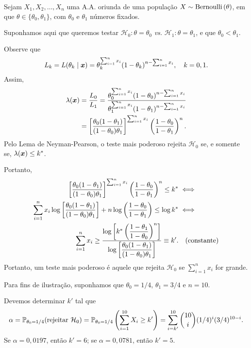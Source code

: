 \begin{example}
Sejam $X_1,X_2,\ldots,X_n$ uma A.A. oriunda de uma população $X\sim\berndist{\theta}$, em que $\theta\in\{\theta_0,\theta_1\}$, com $\theta_0$ e $\theta_1$ números fixados.

Suponhamos aqui que queremos testar $\mathcal{H}_0:\theta=\theta_0$ \emph{vs.} $\mathcal{H}_1:\theta=\theta_1$, e que $\theta_0<\theta_1$.

Observe que
\begin{equation}
L_k=L(\theta_k\mid\v{x})=\theta_k^{\sum_{i=1}^n x_i}(1-\theta_k)^{n-\sum_{i=1}^n x_i}, \quad k=0,1.
\end{equation}
Assim,
\begin{align}
\lambda(\v{x}) &= \frac{L_0}{L_1}=\frac{\theta_0^{\sum_{i=1}^n x_i}(1-\theta_0)^{n-\sum_{i=1}^n x_i}}{\theta_1^{\sum_{i=1}^n x_i}(1-\theta_1)^{n-\sum_{i=1}^n x_i}}\notag\\
&= \left[\frac{\theta_0(1-\theta_1)}{(1-\theta_0)\theta_1}\right]^{\sum_{i=1}^n x_i}\left(\frac{1-\theta_0}{1-\theta_1}\right)^n.
\end{align}
Pelo Lema de Neyman-Pearson, o teste mais poderoso rejeita $\mathcal{H}_0$ se, e somente se, $\lambda(\v{x})\leq k^*$.

Portanto,
\begin{align}
\left[\frac{\theta_0(1-\theta_1)}{(1-\theta_0)\theta_1}\right]^{\sum_{i=1}^n x_i}\left(\frac{1-\theta_0}{1-\theta_1}\right)^n\leq k^* &\iff\notag\\
\sum_{i=1}^n x_i\log\left[\frac{\theta_0(1-\theta_1)}{(1-\theta_0)\theta_1}\right]+n\log\left(\frac{1-\theta_0}{1-\theta_1}\right)\leq\log k^* &\iff\notag\\
\sum_{i=1}^n x_i\geq\frac{\log\left[k^*\left(\dfrac{1-\theta_1}{1-\theta_0}\right)^n\right]}{\log\left[\dfrac{\theta_0(1-\theta_1)}{(1-\theta_0)\theta_1}\right]}\equiv k'. & \quad\text{(constante)}
\end{align}
Portanto, um teste mais poderoso é aquele que rejeita $\mathcal{H}_0$ se $\sum_{i=1}^n x_i$ for grande.

Para fins de ilustração, suponhamos que $\theta_0=1/4$, $\theta_1=3/4$ e $n=10$.

Devemos determinar $k'$ tal que
\begin{equation}
\alpha=\P_{\theta_0=1/4}(\text{rejeitar }\mathcal{H}_0)=\P_{\theta_0=1/4}\left(\sum_{i=1}^{10}X_i\geq k'\right)=\sum_{i=k'}^{10}\binom{10}{i}(1/4)^i(3/4)^{10-i}.
\end{equation}
Se $\alpha=0{,}0197$, então $k'=6$; se $\alpha=0{,}0781$, então $k'=5$.


\end{example}
